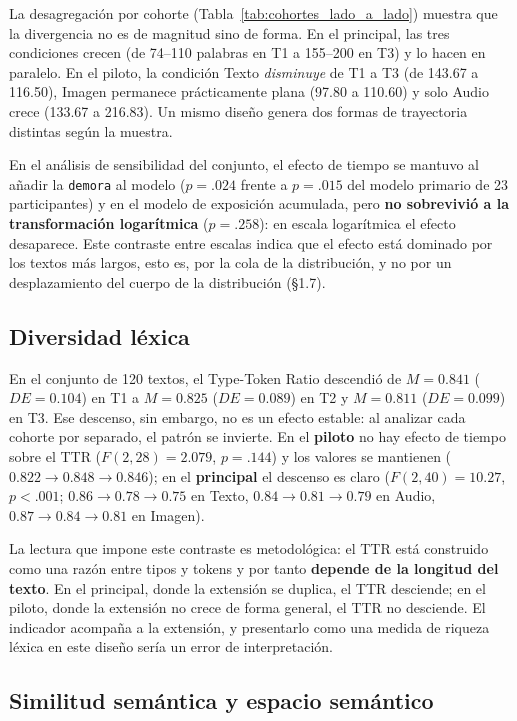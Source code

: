 \documentclass[12pt]{article}
\begin{document}
La desagregación por cohorte (Tabla~\ref{tab:cohortes_lado_a_lado}) muestra que la divergencia
no es de magnitud sino de forma. En el principal, las tres condiciones crecen (de 74--110
palabras en T1 a 155--200 en T3) y lo hacen en paralelo. En el piloto, la condición Texto
\emph{disminuye} de T1 a T3 (de 143.67 a 116.50), Imagen permanece prácticamente plana
(97.80 a 110.60) y solo Audio crece (133.67 a 216.83). Un mismo diseño genera dos formas de
trayectoria distintas según la muestra.

En el análisis de sensibilidad del conjunto, el efecto de tiempo se mantuvo al añadir la
\texttt{demora} al modelo ($p = .024$ frente a $p = .015$ del modelo primario de 23
participantes) y en el modelo de exposición acumulada, pero \textbf{no sobrevivió a la
transformación logarítmica} ($p = .258$): en escala logarítmica el efecto desaparece. Este
contraste entre escalas indica que el efecto está dominado por los textos más largos, esto es,
por la cola de la distribución, y no por un desplazamiento del cuerpo de la distribución
(§1.7).

\subsection{Diversidad léxica}

En el conjunto de 120 textos, el Type-Token Ratio descendió de $M = 0.841$ ($DE = 0.104$) en T1
a $M = 0.825$ ($DE = 0.089$) en T2 y $M = 0.811$ ($DE = 0.099$) en T3. Ese descenso, sin
embargo, no es un efecto estable: al analizar cada cohorte por separado, el patrón se
invierte. En el \textbf{piloto} no hay efecto de tiempo sobre el TTR ($F(2,28) = 2.079$,
$p = .144$) y los valores se mantienen ($0.822 \to 0.848 \to 0.846$); en el \textbf{principal}
el descenso es claro ($F(2,40) = 10.27$, $p < .001$; $0.86 \to 0.78 \to 0.75$ en Texto,
$0.84 \to 0.81 \to 0.79$ en Audio, $0.87 \to 0.84 \to 0.81$ en Imagen).

La lectura que impone este contraste es metodológica: el TTR está construido como una razón
entre tipos y tokens y por tanto \textbf{depende de la longitud del texto}. En el principal,
donde la extensión se duplica, el TTR desciende; en el piloto, donde la extensión no crece de
forma general, el TTR no desciende. El indicador acompaña a la extensión, y presentarlo como
una medida de riqueza léxica en este diseño sería un error de interpretación.

\subsection{Similitud semántica y espacio semántico}
\end{document}
